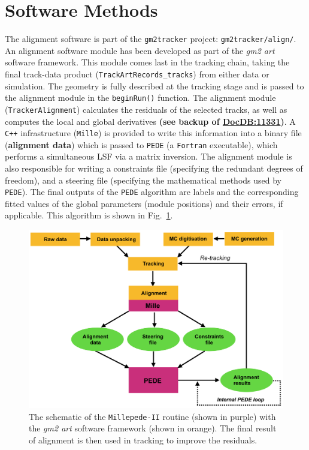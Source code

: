 \documentclass[12pt]{article}
\begin{document}
\section{Software Methods}
The alignment software is part of the \verb!gm2tracker! project: \verb!gm2tracker/align/!. An alignment software module has been developed as part of the \textit{gm2 art} software framework. This module comes last in the tracking chain, taking the final track-data product (\verb!TrackArtRecords_tracks!) from either data or simulation. The geometry is fully described at the tracking stage and is passed to the alignment module in the \verb!beginRun()! function. The alignment module (\verb!TrackerAlignment!) calculates the residuals of the selected tracks, as well as computes the local and global derivatives \textbf{(see backup of \href{https://gm2-docdb.fnal.gov/cgi-bin/private/ShowDocument?docid=11331}{DocDB:11331})}. A \verb!C++! infrastructure (\texttt{Mille}) is provided \cite{mp2} to write this information into a binary file (\textbf{alignment data}) which is passed to \texttt{PEDE} (a \texttt{Fortran} executable), which performs a simultaneous LSF via a matrix inversion. The alignment module is also responsible for writing a constraints file (specifying the redundant degrees of freedom), and a steering file (specifying the mathematical methods used by \texttt{PEDE}). The final outputs of the \texttt{PEDE} algorithm are labels and the corresponding fitted values of the global parameters (module positions) and their errors, if applicable. This algorithm is shown in Fig.~\ref{fig:mp2}.\\
\begin{figure}[h!]
    \centering
    \includegraphics[scale = 0.44]{fig/MP2.png}
    \caption{The schematic of the \texttt{Millepede-II} routine (shown in purple) with the \textit{gm2 art} software framework (shown in orange). The final result of alignment is then used in tracking to improve the residuals.}
    \label{fig:mp2}
\end{figure}
\end{document}
